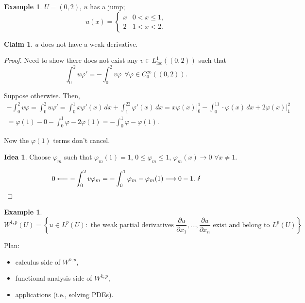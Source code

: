 \documentclass[12pt]{article}
\theoremstyle{definition}
\newtheorem*{claim*}{Claim}
\newtheorem*{idea}{Idea}
\newtheorem{example}{Example}
\newtheorem*{example*}{Example}
\begin{document}
\begin{example}
$U=(0,2)$, $u$ has a jump;
\[u(x)=\left\{\begin{array}{ll}x&0<x\leq1,\\2&1<x<2.\end{array}\right.\]

\begin{claim*}
$u$ does not have a weak derivative.
\end{claim*}

\begin{proof}
Need to show there does not exist any $v\in L_{\text{loc}}^1((0,2))$ such that
\[\int_0^2u\varphi'=-\int_0^2v\varphi\ \ \forall\varphi\in C_0^{\infty}((0,2)).\]

Suppose otherwise. Then,
\begin{multline*}
-\int_0^2v\varphi=\int_0^2u\varphi'=\int_0^1x\varphi'(x)\,dx+\int_1^22\varphi'(x)\,dx=x\varphi(x)\Big|_0^1-\int_0^11\cdot\varphi(x)\,dx+2\varphi(x)\Big|_1^2\\
=\varphi(1)-0-\int_0^1\varphi-2\varphi(1)=-\int_0^1\varphi-\varphi(1).
\end{multline*}

Now the $\varphi(1)$ terms don't cancel.

\begin{idea}
Choose $\varphi_m$ such that $\varphi_m(1)=1$, $0\leq\varphi_m\leq1$, $\varphi_m(x)\rightarrow0$ $\forall x\neq1$.
\end{idea}
\[0\longleftarrow-\int_0^2v\varphi_m=-\int_0^1\varphi_m-\varphi_m(1)\longrightarrow0-1.\ \text{\Lightning}\]
\end{proof}
\end{example}

\begin{example*}
\[W^{1,p}(U)=\left\{u\in L^p(U):\text{ the weak partial derivatives }\frac{\partial u}{\partial x_1},\ldots,\frac{\partial u}{\partial x_n}\text{ exist and belong to }L^p(U)\right\}\]
\end{example*}

Plan:
\begin{itemize}[label=$-$]
\item calculus side of $W^{k,p}$,
\item functional analysis side of $W^{k,p}$,
\item applications (i.e., solving PDEs).
\end{itemize}
\end{document}

